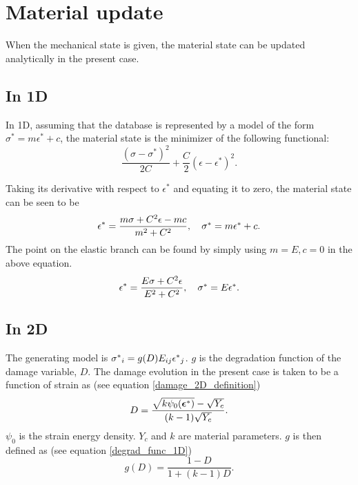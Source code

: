 \documentclass[10pt,review]{cas-sc}
\begin{document}
\section{Material update\label{app_mat_update}}
When the mechanical state is given, the material state can be updated analytically in the present case. 
\subsection*{In 1D}
In 1D, assuming that the database is represented by a model of the form $\sigma^* = m \epsilon ^*+c$, the material state is the minimizer of the following functional:
\begin{equation}
	\frac{(\sigma - \sigma^*)^2}{2C} + \frac{C}{2}(\epsilon - \epsilon^*)^2.	 
\end{equation}

Taking its derivative with respect to $\epsilon^*$ and equating it to zero, the material state can be seen to be
\begin{equation}
	\epsilon^* = \frac{m \sigma + C^2 \epsilon -mc}{m^2 + C^2}, \quad \mbox{$\sigma^*$} = m \mbox{$\epsilon^*$}+c. \label{damage_branch_material_state}
\end{equation}
The point on the elastic branch can be found by simply using $m=E, c=0$ in the above equation.
\begin{equation}
	\epsilon^* = \frac{E \sigma + C^2 \epsilon}{E^2 + C^2}, \quad \mbox{$\sigma^*$} = E \mbox{$\epsilon^*$}. \label{elastic_branch_material_state}
\end{equation}

\subsection*{In 2D}
The generating model is $\mbox{$\sigma^*$}_i = g(D) E_{ij} \mbox{$\epsilon^*$}_j$. $g$ is the degradation function of the damage variable, $D$. The damage evolution in the present case is taken to be a function of strain as (see equation \ref{damage_2D_definition})
\begin{equation*}
	D = \frac{\sqrt{k \psi_0(\mbox{\boldmath $\epsilon$}^*)} - \sqrt{Y_c}}{(k-1)\sqrt{Y_c}}.
\end{equation*}
$\psi_0$ is the strain energy density. $Y_c$ and $k$ are material parameters. $g$ is then defined as (see equation \ref{degrad_func_1D})
\begin{equation*}
	g(D) = \frac{1-D}{1+(k-1)D}.
\end{equation*}
\end{document}
